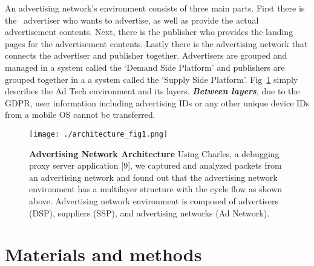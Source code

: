 \documentclass[10pt,letterpaper]{article}
\begin{document}
	An advertising network's environment consists of three main parts. First there is the \ advertiser who wants to advertise, as well as provide the actual advertisement contents. Next, there is the publisher who provides the landing pages for the advertisement contents. Lastly there is the  advertising network that connects the advertiser and publisher together. Advertisers are grouped and managed in a system called the ‘Demand Side Platform' and publishers are grouped together in a a system called the  ‘Supply Side Platform'. Fig~\ref{fig1} simply describes the Ad Tech environment and its layers. \textbf{\textit{Between layers}}, due to the GDPR, user information including advertising IDs or any other unique device IDs from a mobile OS cannot be transferred.


\begin{figure}[H]
\centering
\texttt{[image: ./architecture\_fig1.png]}
\caption{{\bf Advertising Network Architecture}
Using Charles, a debugging proxy server application [9], we captured and analyzed packets from an advertising network and found out that the advertising network environment has a multilayer structure with the cycle flow as shown above. Advertising network environment is composed of advertisers (DSP), suppliers (SSP), and advertising networks (Ad Network).}
\label{fig1}
\end{figure}



\section*{Materials and methods}
\end{document}
